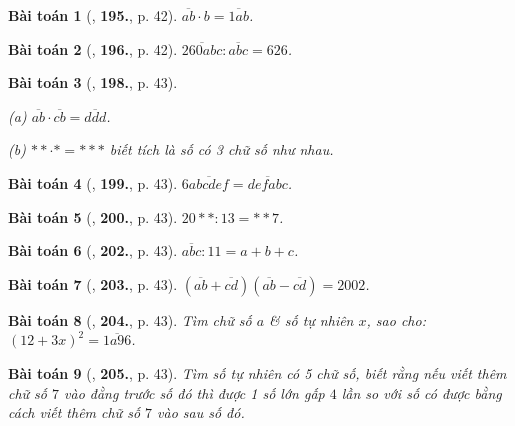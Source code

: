 \documentclass{article}
\numberwithin{equation}{section}
\newtheorem{baitoan}{Bài toán}[section]
\begin{document}
\begin{baitoan}[\cite{Binh_Toan_6_tap_1}, \textbf{195.}, p. 42]
	$\overline{ab}\cdot b = \overline{1ab}$.
\end{baitoan}

\begin{baitoan}[\cite{Binh_Toan_6_tap_1}, \textbf{196.}, p. 42]
	$\overline{260abc}:\overline{abc} = 626$.
\end{baitoan}

\begin{baitoan}[\cite{Binh_Toan_6_tap_1}, \textbf{198.}, p. 43]
	\begin{enumerate*}
		\item[(a)] $\overline{ab}\cdot\overline{cb} = \overline{ddd}$.
		\item[(b)] $**\cdot* = ***$ biết tích là số có 3 chữ số như nhau.
	\end{enumerate*}
\end{baitoan}

\begin{baitoan}[\cite{Binh_Toan_6_tap_1}, \textbf{199.}, p. 43]
	$6\overline{abcdef} = \overline{defabc}$.
\end{baitoan}

\begin{baitoan}[\cite{Binh_Toan_6_tap_1}, \textbf{200.}, p. 43]
	$20**:13 = **7$.
\end{baitoan}

\begin{baitoan}[\cite{Binh_Toan_6_tap_1}, \textbf{202.}, p. 43]
	$\overline{abc}:11 = a + b + c$.
\end{baitoan}

\begin{baitoan}[\cite{Binh_Toan_6_tap_1}, \textbf{203.}, p. 43]
	$(\overline{ab} + \overline{cd})(\overline{ab} - \overline{cd}) = 2002$.
\end{baitoan}

\begin{baitoan}[\cite{Binh_Toan_6_tap_1}, \textbf{204.}, p. 43]
	Tìm chữ số $a$ \& số tự nhiên $x$, sao cho: $(12 + 3x)^2 = \overline{1a96}$.
\end{baitoan}

\begin{baitoan}[\cite{Binh_Toan_6_tap_1}, \textbf{205.}, p. 43]
	Tìm số tự nhiên có 5 chữ số, biết rằng nếu viết thêm chữ số $7$ vào đằng trước số đó thì được 1 số lớn gấp $4$ lần so với số có được bằng cách viết thêm chữ số $7$ vào sau số đó.
\end{baitoan}
\end{document}
